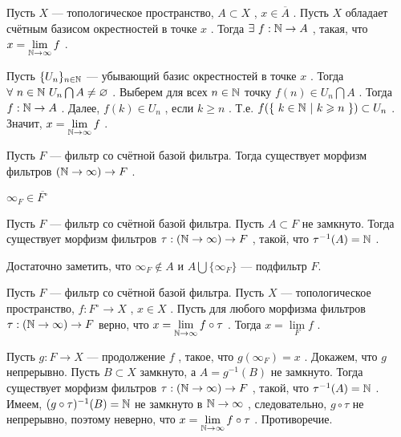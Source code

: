 \SSendp

\SSsect Пусть \( X \) --- топологическое пространство, \( A \subset X \) , \( x \in \overline{A} \) . Пусть \( X \) обладает счётным базисом окрестностей в точке \( x \) . Тогда \( \exists~f:\mathbb{N} \rightarrow A \) , такая, что \( x = \lim\limits_{\mathbb{N} \rightarrow \infty} f \) .

\SSproof

Пусть \( \{U_n\}_{n \in \mathbb{N}} \) --- убывающий базис окрестностей в точке \( x \) . Тогда \( \forall~n \in \mathbb{N}~U_n\bigcap A \neq \varnothing \) . Выберем для всех \( n \in \mathbb{N} \) точку \( f(n) \in U_n\bigcap A \) . Тогда \( f:\mathbb{N} \rightarrow A \) . Далее, \( f(k) \in U_n \) , если \( k \geqslant n \) . Т.е. \( f(\{~k \in \mathbb{N}~|~k \geqslant n~\}) \subset U_n \) . Значит, \( x = \lim\limits_{\mathbb{N} \rightarrow \infty} f \) .

\SSendp

\SSsect Пусть \( F \) --- фильтр со счётной базой фильтра. Тогда существует морфизм фильтров \( (\mathbb{N} \rightarrow \infty) \rightarrow F \) .

\SSproof

\( \infty_F \in \overline{F^{\circ}} \)

\SSendp

\SSsect Пусть \( F \) --- фильтр со счётной базой фильтра. Пусть \( A \subset F \) не замкнуто. Тогда существует морфизм фильтров \( \tau: (\mathbb{N} \rightarrow \infty) \rightarrow F \) , такой, что \( \tau^{-1}(A) = \mathbb{N} \) .

\SSproof

Достаточно заметить, что \( \infty_F \notin A \) и \( A \bigcup \{\infty_F\} \) --- подфильтр \( F \).

\SSendp

\SSsect Пусть \( F \) --- фильтр со счётной базой фильтра. Пусть \( X \) --- топологическое пространство, \( f:F^{\circ} \rightarrow X \) , \( x \in X \) . Пусть для любого морфизма фильтров \( \tau: (\mathbb{N} \rightarrow \infty) \rightarrow F \) верно, что \( x =  \lim\limits_{\mathbb{N} \rightarrow \infty} f \circ \tau \) . Тогда \( x =  \lim\limits_{F} f \) .

\SSproof

Пусть \( g:F \rightarrow X \) --- продолжение \( f \) , такое, что \( g(\infty_F)=x \) . Докажем, что \( g \) непрерывно. Пусть \( B \subset X \) замкнуто, а \( A = g^{-1}(B) \) не замкнуто. Тогда существует морфизм фильтров \( \tau: (\mathbb{N} \rightarrow \infty) \rightarrow F \) , такой, что \( \tau^{-1}(A) = \mathbb{N} \) . Имеем, \( (g \circ \tau)^{-1}(B) = \mathbb{N} \) не замкнуто в \( \mathbb{N} \rightarrow \infty \) , следовательно, \( g \circ \tau \) не непрерывно, поэтому неверно, что \( x =  \lim\limits_{\mathbb{N} \rightarrow \infty} f \circ \tau \) . Противоречие.

\SSendp


